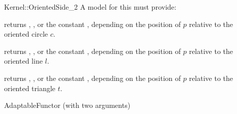 \begin{ccRefFunctionObjectConcept}{Kernel::OrientedSide_2}
A model for this must provide:


{returns ,
, or the constant ,
depending on the position of $p$  relative to the oriented circle $c$.}

{returns ,
, or the constant ,
depending on the position of $p$  relative to the oriented line $l$.}

{returns ,
, or the constant ,
depending on the position of $p$  relative to the oriented triangle $t$.}

\ccRefines
AdaptableFunctor (with two arguments)

\ccSeeAlso
{} \\
 \\
 \\


\end{ccRefFunctionObjectConcept}
